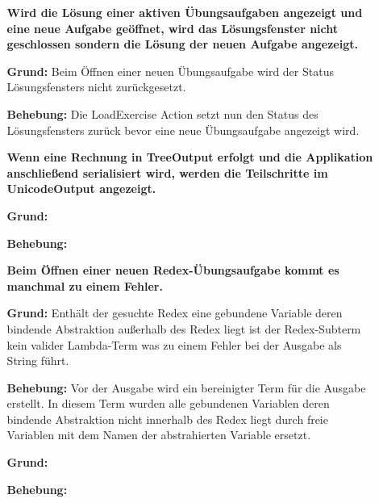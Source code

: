\documentclass[parskip=full,11pt,openany]{scrreprt}
\begin{document}
\begin{itemize}[itemsep=3ex]

\item[] %
\begin{itemize}[noitemsep]
\item[] {\bfseries Wird die Lösung einer aktiven Übungsaufgaben angezeigt und eine neue Aufgabe geöffnet, wird das Lösungsfenster nicht geschlossen sondern die Lösung der neuen Aufgabe angezeigt. }
\item [\textbf{Grund:}] Beim Öffnen einer neuen Übungsaufgabe wird der Status Lösungsfensters nicht zurückgesetzt.
\item [\textbf{Behebung:}] Die LoadExercise Action setzt nun den Status des Lösungsfensters zurück bevor eine neue Übungsaufgabe angezeigt wird.
\end{itemize}

\item[] %
\begin{itemize}[noitemsep]
\item[] {\bfseries Wenn eine Rechnung in TreeOutput erfolgt und die Applikation anschließend serialisiert wird, werden die Teilschritte im UnicodeOutput angezeigt. }
\item [\textbf{Grund:}]
\item [\textbf{Behebung:}]
\end{itemize}

\item[] %
\begin{itemize}[noitemsep]
\item[] {\bfseries Beim Öffnen einer neuen Redex-Übungsaufgabe kommt es manchmal zu einem Fehler. }
\item [\textbf{Grund:}] Enthält der gesuchte Redex eine gebundene Variable deren bindende Abstraktion außerhalb des Redex liegt ist der Redex-Subterm kein valider Lambda-Term was zu einem Fehler bei der Ausgabe als String führt. 
\item [\textbf{Behebung:}]  Vor der Ausgabe wird ein bereinigter Term für die Ausgabe erstellt. In diesem Term wurden alle gebundenen Variablen deren bindende Abstraktion nicht innerhalb des Redex liegt durch freie Variablen mit dem Namen der abstrahierten Variable ersetzt.
\end{itemize}

\item[] %
\begin{itemize}[noitemsep]
\item[] {\bfseries  }
\item [\textbf{Grund:}]
\item [\textbf{Behebung:}]
\end{itemize}


\end{itemize}
\end{document}
